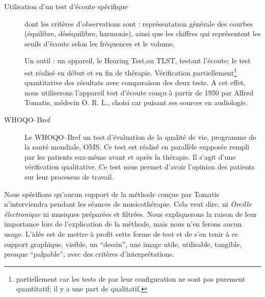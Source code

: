 \begin{description}
	\item[Utilisation d'un test d'écoute spécifique] dont les critères d'observations sont : représentation générale des courbes (équilibre, déséquilibre, harmonie), ainsi que les chiffres qui représentent les seuils d'écoute selon les fréquences et le volume. 
		
	Un outil :  un appareil, le Hearing Test,ou TLST, testant l'écoute; le test est réalisé en début et en fin de thérapie. 
	Vérification partiellement\footnote{partiellement  car les tests de par leur configuration ne sont pas purement quantitatif; il y a une part de qualitatif.} quantitative des résultats avec comparaison des deux tests. 
	A cet effet, nous utiliserons l'appareil test d'écoute conçu à partir de 1950 par Alfred Tomatis, médecin O. R. L., choisi car puisant ses sources en audiologie.
	
	
	
	\item[WHOQO--Bref] Le WHOQO--Bref un test d'évaluation de la qualité de vie, programme de la santé mondiale, OMS.
	Ce test est réalisé en parallèle supposée rempli par les patients eux-même  avant et après la thérapie.
	Il s'agit d'une vérification qualitative. Ce test nous permet d'avoir l'opinion des patients sur leur processus de travail.
	
	
	 
\end{description}











	




Nous spécifions qu'aucun support de la méthode conçue par Tomatis n'interviendra pendant les séances de musicothérapie.
Cela veut dire, ni 
\textsl{Oreille
	électronique} ni musiques préparées et filtrées. Nous expliquerons la 
raison de   leur importance lors de l'explication de la méthode, mais nous n'en ferons aucun usage. L'idée est de 
mettre à profit cette forme de test et de  s'en tenir à ce support
graphique, visible, un ``dessin'', une image utile, utilisable, tangible,
presque ``palpable'', avec des critères
d'interprétations.
	



 



